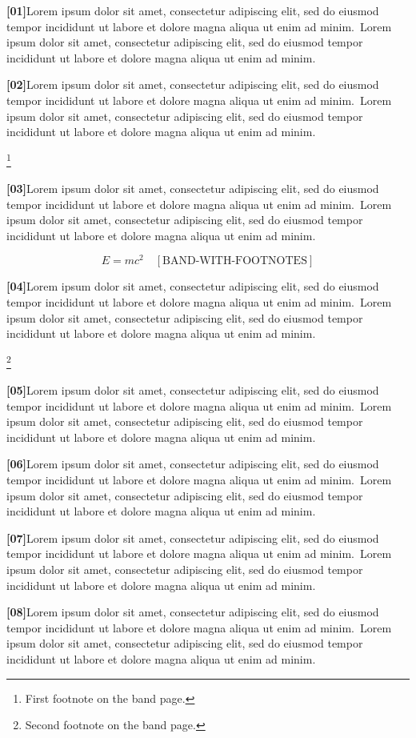 \documentclass[twocolumn]{article}
\newcommand\Body{Lorem ipsum dolor sit amet, consectetur adipiscing elit, sed do
eiusmod tempor incididunt ut labore et dolore magna aliqua ut enim ad minim.}
\newcommand\Par[1]{\par\noindent\textbf{[#1]}\space\Body\ \Body\par\medskip}
\begin{document}
\Par{01}\Par{02}\footnote{First footnote on the band page.}\Par{03}
\begin{wideband}\[ E=mc^2 \quad[\text{BAND-WITH-FOOTNOTES}] \]\end{wideband}
\Par{04}\footnote{Second footnote on the band page.}\Par{05}\Par{06}\Par{07}\Par{08}
\end{document}
